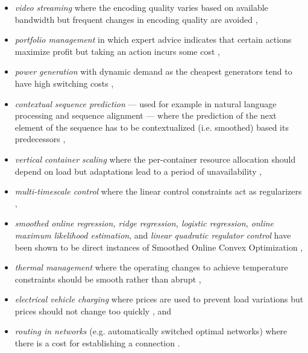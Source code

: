 \begin{itemize}
    \item \textit{video streaming} where the encoding quality varies based on available bandwidth but frequent changes in encoding quality are avoided \cite{Lin2012},
    \item \textit{portfolio management} in which expert advice indicates that certain actions maximize profit but taking an action incurs some cost \cite{Calafiore2008, Das2014, Ballu2019},
    \item \textit{power generation} with dynamic demand as the cheapest generators tend to have high switching costs \cite{Lin2012, Badiei2015},
    \item \textit{contextual sequence prediction} --- used for example in natural language processing and sequence alignment --- where the prediction of the next element of the sequence has to be contextualized (i.e. smoothed) based its predecessors \cite{Kim2015},
    \item \textit{vertical container scaling} where the per-container resource allocation should depend on load but adaptations lead to a period of unavailability \cite{Rossi2019},
    \item \textit{multi-timescale control} where the linear control constraints act as regularizers \cite{Goel2017},
    \item \textit{smoothed online regression, ridge regression, logistic regression, online maximum likelihood estimation}, and \textit{linear quadratic regulator control} have been shown to be direct instances of Smoothed Online Convex Optimization \cite{Goel2018},
    \item \textit{thermal management} where the operating changes to achieve temperature constraints should be smooth rather than abrupt \cite{Zanini2009},
    \item \textit{electrical vehicle charging} where prices are used to prevent load variations but prices should not change too quickly \cite{Kim2014}, and
    \item \textit{routing in networks} (e.g. automatically switched optimal networks) where there is a cost for establishing a connection \cite{Lin2012}.
\end{itemize}
